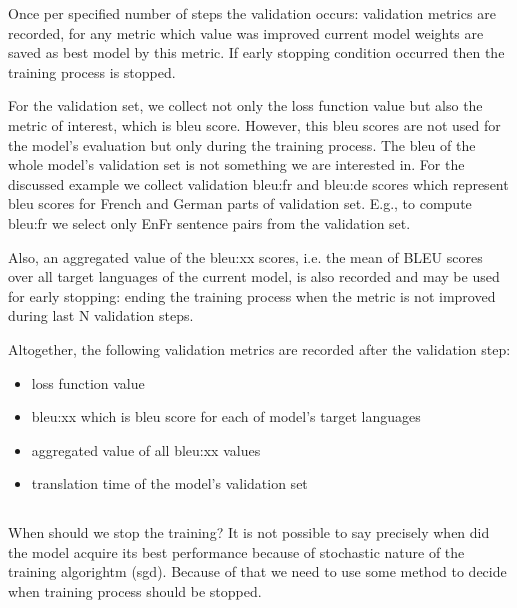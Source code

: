 Once per specified number of steps the validation occurs:
validation metrics are recorded, for any metric which value was
improved current model weights are saved as best model by this metric.
If early stopping condition occurred then the training process is stopped.

For the validation set, we collect not only the loss function value
but also the metric of interest, which is \acrshort{bleu} score.
However, this \acrshort{bleu} scores are not used for the model's
evaluation but only during the training process.
The \acrshort{bleu} of the whole model's validation set
is not something we are interested in.
For the discussed example we collect validation bleu:fr and bleu:de scores
which represent \acrshort{bleu} scores for French and German
parts of validation set.
E.g., to compute bleu:fr we select only En\to{}Fr sentence pairs from the
validation set.

Also, an aggregated value of the bleu:xx scores, i.e. the mean of BLEU scores
over all target languages of the current model, is also recorded
and may be used for early stopping: ending the training process
when the metric is not improved during last N validation steps.

\begin{samepage}
Altogether, the following validation metrics are recorded after the
validation step:
\begin{itemize}
	\item loss function value
	\item bleu:xx which is \acrshort{bleu} score for each of
	model's target languages
	\item aggregated value of all bleu:xx values
	\item translation time of the model's validation set
\end{itemize}
\end{samepage}

\subsection{}
\label{section:finishing-the-training}

When should we stop the training?
It is not possible to say precisely when did the model
acquire its best performance because of stochastic nature of
the training algorightm (\acrshort{sgd}).
Because of that we need to use some method to decide when
training process should be stopped.


